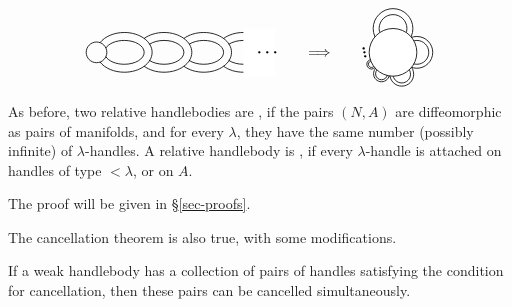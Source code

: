 \[ \begin{tikzpicture}[line width=.6, baseline=(base.base)]
    \draw (0,0) circle (.26);
    \draw (1.4,0) arc (0 : 151 : .7 and .5);
    \draw (1.4,0) arc (0 : -151 : .7 and .5);
    \draw (1.2,0) arc (0 : 159 : .5 and .3);
    \draw (1.2,0) arc (0 : -159 : .5 and .3);
    \draw (2.4,0) arc (0 : 136 : .7 and .5);
    \draw (2.4,0) arc (0 : -136 : .7 and .5);
    \draw (2.2,0) arc (0 : 138 : .5 and .3);
    \draw (2.2,0) arc (0 : -138 : .5 and .3);
    \draw (3.4,0) arc (0 : 136 : .7 and .5);
    \draw (3.4,0) arc (0 : -136 : .7 and .5);
    \draw (3.2,0) arc (0 : 138 : .5 and .3);
    \draw (3.2,0) arc (0 : -138 : .5 and .3);
    \draw (4.4,0) arc (0 : 136 : .7 and .5);
    \draw (4.4,0) arc (0 : -136 : .7 and .5);
    \draw (4.2,0) arc (0 : 138 : .5 and .3);
    \draw (4.2,0) arc (0 : -138 : .5 and .3);
    \fill[white] (3.7,.6) rectangle (4.5,-.6);
    \fill (4.1,0) circle (.03);
    \fill (4.3,0) circle (.03);
    \fill (4.5,0) circle (.03);
    \node (base) at (0,-.1) {};
\end{tikzpicture}
\qquad\Longrightarrow\qquad
\begin{tikzpicture}[line width=.6, baseline=(base.base)]
    \draw[fill=white] (0,.6) circle (.5);
    \draw[fill=white] (0,.6) circle (.35);
    \draw[fill=white] (.6,0) circle (.4);
    \draw[fill=white] (.6,0) circle (.3);
    \draw[fill=white] (.22,-.55) circle (.3);
    \draw[fill=white] (.22,-.55) circle (.22);
    \draw[fill=white] (-.29,-.54) circle (.2);
    \draw[fill=white] (-.29,-.54) circle (.15);
    \draw[fill=white] (-.54,-.3) circle (.12);
    \draw[fill=white] (-.54,-.3) circle (.08);
    \draw[fill=white] (0,0) circle (.6);
    \fill (-.7, -.1) circle (.03);
    \fill (-.72, 0) circle (.03);
    \fill (-.74, .1) circle (.03);
    \node (base) at (0,-.1) {};
\end{tikzpicture} \]

As before, two relative handlebodies are ,
if the pairs $(N,A)$ are diffeomorphic as pairs of manifolds,
and for every $\lambda$, they have the same number (possibly infinite)
of $\lambda$-handles.
A relative handlebody is ,
if every $\lambda$-handle is attached on handles of type $<\lambda$, or on $A$.

The proof will be given in \S\ref{sec-proofs}.

The cancellation theorem is also true,
with some modifications.

\begin{theorem}[Cancellation] \label{thm-cancel-weak}
    If a weak handlebody has a collection of pairs of handles
    satisfying the condition for cancellation,
    then these pairs can be cancelled simultaneously.
\end{theorem}

